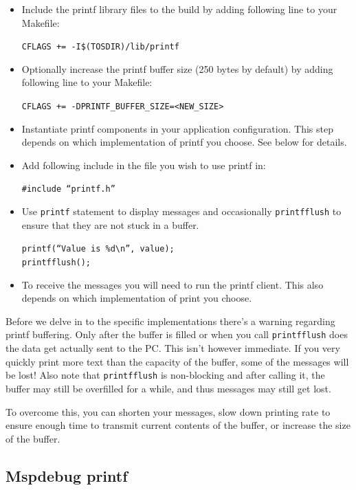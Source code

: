 \begin{itemize}
  \item Include the printf library files to the build by adding
    following line to your Makefile:

    \texttt{CFLAGS += -I\$(TOSDIR)/lib/printf}

  \item Optionally increase the printf buffer size (250 bytes by
    default) by adding following line to your Makefile:

    \texttt{CFLAGS += -DPRINTF\_BUFFER\_SIZE=<NEW\_SIZE>}

  \item Instantiate printf components in your application
    configuration. This step depends on which implementation of
    printf you choose. See below for details.

  \item Add following include in the file you wish to use printf in:

    \texttt{\#include ``printf.h''}

  \item Use \texttt{printf} statement to display messages and
    occasionally \texttt{printfflush} to ensure that they are not stuck
    in a buffer.

    \texttt{printf(``Value is \%d\textbackslash n'', value);} \\
    \texttt{printfflush();}

  \item To receive the messages you will need to run the printf
    client. This also depends on which implementation of print you
    choose.
\end{itemize}

Before we delve in to the specific implementations there's a warning
regarding printf buffering. Only after the buffer is filled or when
you call \texttt{printfflush} does the data get actually sent to the
PC. This isn't however immediate. If you very quickly print more text
than the capacity of the buffer, some of the messages will be lost!
Also note that \texttt{printfflush} is non-blocking and after calling
it, the buffer may still be overfilled for a while, and thus messages
may still get lost.

To overcome this,  you can shorten your messages, slow down printing
rate to ensure enough time to transmit current contents of the buffer,
or increase the size of the buffer.

\subsection{Mspdebug printf}

